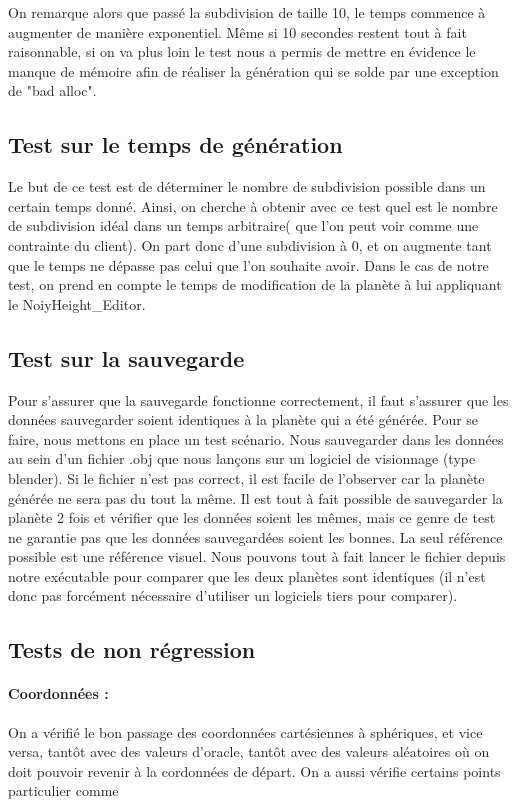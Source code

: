\documentclass[a4paper]{article}
\begin{document}
On remarque alors que passé la subdivision de taille 10, le temps commence à augmenter de manière exponentiel. Même si 10 secondes restent tout à fait raisonnable, si on va plus loin le test nous a permis de mettre en évidence le manque de mémoire afin de réaliser la génération qui se solde par une exception de "bad alloc".

\subsection{Test sur le temps de génération}
Le but de ce test est de déterminer le nombre de subdivision possible dans un certain temps donné. Ainsi, on cherche à obtenir avec ce test quel est le nombre de subdivision idéal dans un temps arbitraire( que l'on peut voir comme une contrainte du client). On part donc d'une subdivision à 0, et on augmente tant que le temps ne dépasse pas celui que l'on souhaite avoir. Dans le cas de notre test, on prend en compte le temps de modification de la planète à lui appliquant le NoiyHeight\_Editor.

\subsection{Test sur la sauvegarde}
Pour s'assurer que la sauvegarde fonctionne correctement, il faut s'assurer que les données sauvegarder soient identiques à la planète qui a été générée. Pour se faire, nous mettons en place un test scénario. Nous sauvegarder dans les données au sein d'un fichier .obj que nous lançons sur un logiciel de visionnage (type blender). Si le fichier n'est pas correct, il est facile de l'observer car la planète générée ne sera pas du tout la même. Il est tout à fait possible de sauvegarder la planète 2 fois et vérifier que les données soient les mêmes, mais ce genre de test ne garantie pas que les données sauvegardées soient les bonnes. La seul référence possible est une référence visuel. Nous pouvons tout à fait lancer le fichier depuis notre exécutable pour comparer que les deux planètes sont identiques (il n'est donc pas forcément nécessaire d'utiliser un logiciels tiers pour comparer).

\subsection{Tests de non régression}

\paragraph{Coordonnées : } On a vérifié le bon passage des coordonnées cartésiennes à sphériques, et vice versa, tantôt avec des valeurs d'oracle, tantôt avec des valeurs aléatoires où on doit pouvoir revenir à la cordonnées de départ.
On a aussi vérifie certains points particulier comme 
\end{document}
